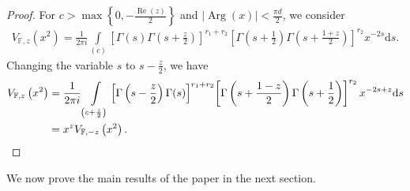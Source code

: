 \documentclass[12pt,reqno]{amsart}
\newcommand{\Arg}{\operatorname{Arg}}
\renewcommand{\Re}{\operatorname{Re}}
\renewcommand{\(}{\left\(}
\renewcommand{\)}{\right\)}
\renewcommand{\[}{\left\[}
\renewcommand{\]}{\right\]}
\numberwithin{equation}{section}
\theoremstyle{plain}
\begin{document}
\begin{proof}
For $c > \max\left\{0, -\frac{\Re(z)}{2}\right\}$ and $|\Arg(x)| < \frac{\pi d}{2}$, we consider
\begin{align*}
V_{\mathbb{F},z}\left(x^2\right)
= \frac{1}{2\pi i}\int\limits_{(c)}\left[\Gamma(s)\Gamma\left(s+\frac{z}{2}\right)\right]^{r_1+r_2}\!\left[\Gamma\left(s+\frac{1}{2}\right)\Gamma\left(s+\frac{1+z}{2}\right)\right]^{r_2}\!x^{-2s} \textrm{d}s.
\end{align*}
Changing the variable $s$ to $s-\frac{z}{2}$, we have
\begin{align*}
V_{\mathbb{F},z}\left(x^2\right) 
&= \frac{1}{2\pi i}\int\limits_{\left(c+\frac{z}{2}\right)}\left[\Gamma\left(s-\frac{z}{2}\right)\Gamma(s)\right]^{r_1+r_2}\!\left[\Gamma\left(s+\frac{1-z}{2}\right)\Gamma\left(s+\frac{1}{2}\right)\right]^{r_2}x^{-2s+z} \textrm{d}s \notag \\
&= x^{z}V_{\mathbb{F},-z}\left(x^2\right).
\end{align*}
\end{proof}
We now prove the main results of the paper in the next section.
\end{document}

